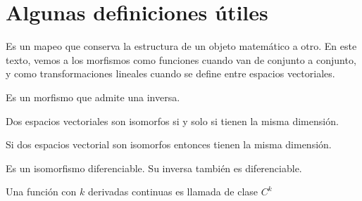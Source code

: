 \chapter{Algunas definiciones \'utiles}

\begin{definition}[Morfismo]
    \label{def:morphism}
    Es un mapeo que conserva la estructura de un objeto matem\'atico a otro. En este texto, vemos a los
    morfismos como funciones cuando van de conjunto a conjunto, y como transformaciones lineales cuando
    se define entre espacios vectoriales.
\end{definition}

\begin{definition}[Isomorfismo]
    \label{def:isomorphism}
    Es un morfismo que admite una inversa.
\end{definition}

\begin{theorem}
    Dos espacios vectoriales son isomorfos si y solo si tienen la misma dimensi\'on.
\end{theorem}

\begin{lemma}
    \label{lem:vector-space-dimension}
    Si dos espacios vectorial son isomorfos entonces tienen la misma dimensi\'on.
\end{lemma}

\begin{definition}[Difeomorfismo]
    \label{def:diffeomorphism}
    Es un isomorfismo diferenciable. Su inversa tambi\'en es diferenciable.
\end{definition}
\begin{definition}[Funci\'on $C^{k}$]
    \label{def:ck function}
    Una funci\'on con $k$ derivadas continuas es llamada de clase $C^{k}$
\end{definition}

